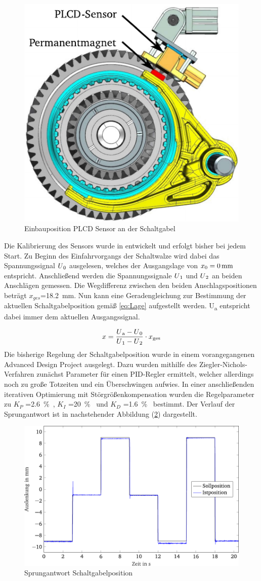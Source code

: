 \begin{figure}[h]
	\centering
		\includegraphics[width=0.35\columnwidth]{Bilder/Sensor.pdf}
	\caption{Einbauposition PLCD Sensor an der Schaltgabel \cite[S.14]{adp}}
	\label{fig:Sensor}
\end{figure} \noindent
Die Kalibrierung des Sensors wurde in \cite[S.24f]{messtechnik} entwickelt und erfolgt bisher bei jedem Start. Zu Beginn des Einfahrvorgangs der Schaltwalze wird dabei das Spannungssignal $U\textsubscript{0}$ ausgelesen, welches der Ausgangslage von $x\textsubscript{0}=\SI{0}{mm}$ entspricht. Anschließend werden die Spannungssignale $U\textsubscript{1}$ und $U\textsubscript{2}$ an beiden Anschlägen gemessen. Die Wegdifferenz zwischen den beiden Anschlagspositionen beträgt $x_{ges}$=\SI{18,2}{mm}. Nun kann eine Geradengleichung zur Bestimmung der aktuellen Schaltgabelposition gemäß \autoref{eq:Lage} aufgestellt werden. U\textsubscript{a} entspricht dabei immer dem aktuellen Ausgangssignal.

\begin{equation}\label{eq:Lage}
	x=\frac{U\textsubscript{a} -U\textsubscript{0}}{U\textsubscript{1}-U\textsubscript{2}}\cdot x\textsubscript{ges}
\end{equation}
\noindent
Die bisherige Regelung der Schaltgabelposition wurde in einem vorangegangenen Advanced Design Project ausgelegt. Dazu wurden mithilfe des Ziegler-Nichols-Verfahren zunächst Parameter für einen PID-Regler ermittelt, welcher allerdings noch zu große Totzeiten und ein Überschwingen aufwies. In einer anschließenden iterativen Optimierung mit Störgrößenkompensation wurden die Regelparameter zu $K_P$ =\SI{2,6}{\%}, $K_I$ =\SI{20}{\%} und $K_D$ =\SI{1,6}{\%} bestimmt. Der Verlauf der Sprungantwort ist in nachstehender Abbildung (\ref{fig:Sprungantwort Schaltgabelposition}) dargestellt.
\begin{figure}[h]
	\centering
		\includegraphics[width=0.6\columnwidth]{Bilder/SprungantwortSchaltgabelposition.pdf}
	\caption{Sprungantwort Schaltgabelposition \cite[S.35]{adp}}
	\label{fig:Sprungantwort Schaltgabelposition}
\end{figure} \noindent

